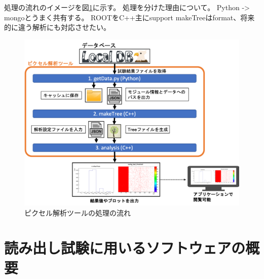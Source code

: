 処理の流れのイメージを図\ref{analysis_tool_flow}に示す。
処理を分けた理由について。
Python -> mongoとうまく共有する。
ROOTをC++主にsupport
makeTreeはformat、将来的に違う解析にも対応させたい。

\begin{figure}[bpt]\centering
\includegraphics[width=12cm]{analysis_tool_flow}
\caption[ピクセル解析ツールの処理の流れ]{ピクセル解析ツールの処理の流れ}
\label{analysis_tool_flow}
\end{figure}

\section{読み出し試験に用いるソフトウェアの概要}

